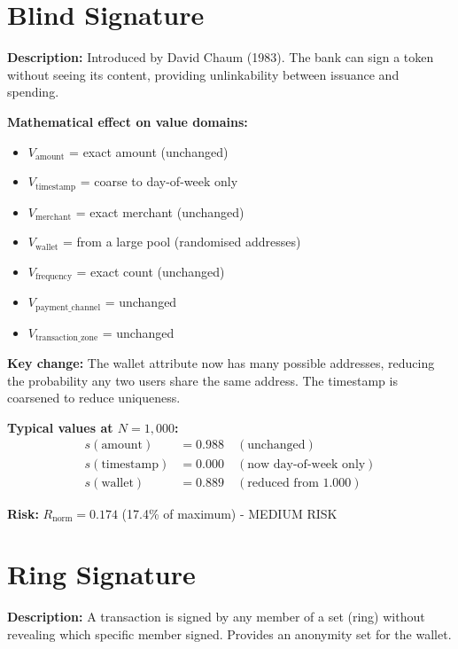 \documentclass[12pt,a4paper,oneside,openany]{report}
\begin{document}
\section{Blind Signature}
\label{sec:blind}

\textbf{Description:} Introduced by David Chaum (1983). The bank can sign a token without seeing its content, providing unlinkability between issuance and spending.

\textbf{Mathematical effect on value domains:}
\begin{itemize}
    \item $V_{\text{amount}}$ = exact amount (unchanged)
    \item $V_{\text{timestamp}}$ = coarse to day-of-week only
    \item $V_{\text{merchant}}$ = exact merchant (unchanged)
    \item $V_{\text{wallet}}$ = from a large pool (randomised addresses)
    \item $V_{\text{frequency}}$ = exact count (unchanged)
    \item $V_{\text{payment\_channel}}$ = unchanged
    \item $V_{\text{transaction\_zone}}$ = unchanged
\end{itemize}

\textbf{Key change:} The wallet attribute now has many possible addresses, reducing the probability any two users share the same address. The timestamp is coarsened to reduce uniqueness.

\textbf{Typical values at $N = 1,000$:}
\begin{align*}
s(\text{amount}) &= 0.988 \quad (\text{unchanged})\\
s(\text{timestamp}) &= 0.000 \quad (\text{now day-of-week only})\\
s(\text{wallet}) &= 0.889 \quad (\text{reduced from 1.000})
\end{align*}

\textbf{Risk:} $R_{\mathrm{norm}} = 0.174$ (17.4\% of maximum) - MEDIUM RISK

\section{Ring Signature}
\label{sec:ring}

\textbf{Description:} A transaction is signed by any member of a set (ring) without revealing which specific member signed. Provides an anonymity set for the wallet.
\end{document}
